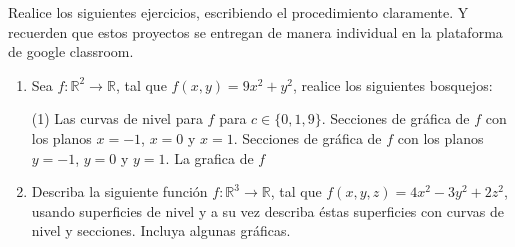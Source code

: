 \documentclass[letterpaper,11pt]{article}
\newcommand{\informacion}[1]{
\begin{center}
\fbox{\fbox{\parbox{\textwidth}{{\footnotesize#1}}}}
\end{center}
\vspace{5mm}}
\begin{document}


 
\noindent Realice los siguientes ejercicios, escribiendo el procedimiento claramente. Y recuerden que estos proyectos se entregan de manera individual en la plataforma de google classroom. 


\begin{enumerate}


\item  Sea $f:\mathbb{R}^2 \longrightarrow \mathbb{R}$, tal que $f(x,y) = 9x^2 + y^2$, realice los siguientes bosquejos: 

\begin{tasks}(1)
\task Las curvas de nivel para $f$ para $c \in \{0, 1, 9\}$.
\task Secciones de gráfica de $f$ con los planos $x = -1$, $x = 0$ y $x = 1$.
\task Secciones de gráfica de $f$ con los planos $y = -1$, $y = 0$ y $y = 1$.
\task La grafica de $f$
\end{tasks}

\item Describa la siguiente función $f:\mathbb{R}^3 \longrightarrow \mathbb{R}$, tal que $f(x,y,z) = 4x^2-3y^2+2z^2$, usando superficies de nivel y a su vez describa éstas superficies con curvas de nivel y secciones. Incluya algunas gráficas.




\end{enumerate}
\end{document}
